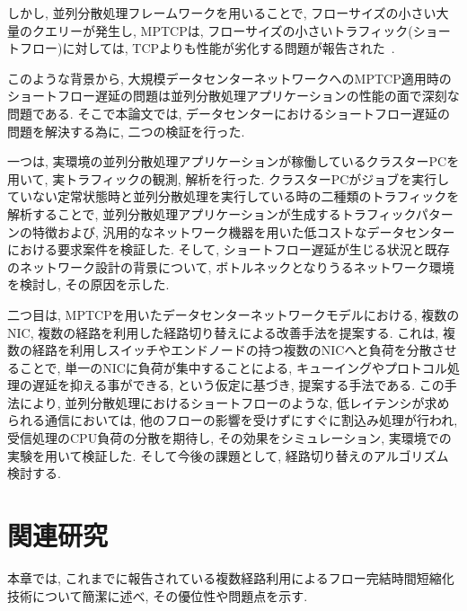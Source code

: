 \documentclass[11pt, a4paper, twocolumn]{jsarticle}
\begin{document}
しかし, 並列分散処理フレームワークを用いることで, フローサイズの小さい大量のクエリーが発生し, MPTCPは,
フローサイズの小さいトラフィック(ショートフロー)に対しては, TCPよりも性能が劣化する問題が報告された~\cite{improving}.

このような背景から, 大規模データセンターネットワークへのMPTCP適用時のショートフロー遅延の問題は並列分散処理アプリケーションの性能の面で深刻な問題である.
そこで本論文では, データセンターにおけるショートフロー遅延の問題を解決する為に, 二つの検証を行った.

一つは, 実環境の並列分散処理アプリケーションが稼働しているクラスターPCを用いて, 実トラフィックの観測, 解析を行った.
クラスターPCがジョブを実行していない定常状態時と並列分散処理を実行している時の二種類のトラフィックを解析することで,
並列分散処理アプリケーションが生成するトラフィックパターンの特徴および, 汎用的なネットワーク機器を用いた低コストなデータセンターにおける要求案件を検証した.
そして, ショートフロー遅延が生じる状況と既存のネットワーク設計の背景について, ボトルネックとなりうるネットワーク環境を検討し, その原因を示した.

二つ目は, MPTCPを用いたデータセンターネットワークモデルにおける, 複数のNIC, 複数の経路を利用した経路切り替えによる改善手法を提案する.
これは, 複数の経路を利用しスイッチやエンドノードの持つ複数のNICへと負荷を分散させることで, 単一のNICに負荷が集中することによる,
キューイングやプロトコル処理の遅延を抑える事ができる, という仮定に基づき, 提案する手法である.
この手法により, 並列分散処理におけるショートフローのような, 低レイテンシが求められる通信においては, 他のフローの影響を受けずにすぐに割込み処理が行われ, 受信処理のCPU負荷の分散を期待し, その効果をシミュレーション, 実環境での実験を用いて検証した.
そして今後の課題として, 経路切り替えのアルゴリズム検討する.


\section{関連研究}
\label{sec:related}
本章では, これまでに報告されている複数経路利用によるフロー完結時間短縮化技術について簡潔に述べ, その優位性や問題点を示す.
\end{document}

